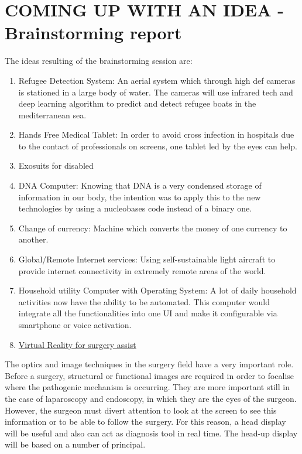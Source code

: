 \documentclass{article}
\begin{document}
\thispagestyle{empty}
\cleardoublepage
{}
\setcounter{page}{1}


\section{COMING UP WITH AN IDEA - Brainstorming report }\label{sec:intro}



The ideas resulting of the brainstorming session are:
	
\begin{enumerate}
	\item Refugee  Detection System: An aerial system which through high def cameras is stationed in a large body of water. The cameras will use infrared tech and deep learning algorithm to predict and detect refugee boats in the mediterranean sea.

	\item Hands Free Medical Tablet: In order to avoid cross infection in hospitals due to the contact of professionals on screens, one tablet led by the eyes can help.

	\item Exosuits for disabled 

	\item DNA Computer: Knowing that DNA is a very condensed storage of information in our body, the intention was to apply this to the new technologies by using a nucleobases code instead of a binary one. 

	\item Change of currency: Machine which converts the money of one currency to another.

	\item Global/Remote Internet services: Using self-sustainable light aircraft to provide internet connectivity in extremely remote areas of the world.

	\item Household utility Computer with Operating System: A lot of daily household activities now have the ability to be automated. This computer would integrate all the functionalities into one UI and make it configurable via smartphone or voice activation. 

	\item\underline{Virtual Reality for surgery assist}
\end{enumerate}
The optics and image techniques in the surgery field have a very important role. Before a surgery, structural or functional images are required in order to focalise where the pathogenic mechanism is occurring. They are more important still in the case of laparoscopy and endoscopy, in which they are the eyes of the surgeon. However, the surgeon must divert attention to look at the screen to see this information or to be able to follow the surgery. For this reason, a head display will be useful and also can act as diagnosis tool in real time. The head-up display will be based on a number of principal.
\end{document}
